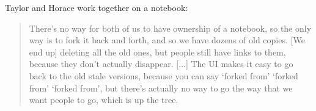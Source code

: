 Taylor and Horace work together on a notebook:
\begin{quote}
There's no way for both of us
to have ownership of a notebook, so the only way is to fork it back and forth,
and so we have dozens of old copies. [We end up] deleting all the old ones, but
people still have links to them, because they don't actually disappear. [...]
The UI makes it easy to go back to the old stale versions, because you can say
`forked from' `forked from' `forked from', but there's actually no way to go the
way that we want people to go, which is up the tree.
\end{quote}

